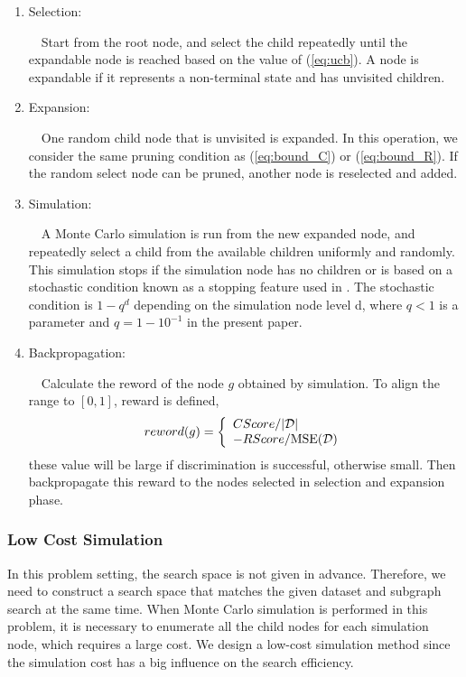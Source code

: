 \begin{enumerate}
	\item{Selection}:

	~~Start from the root node, and select the child repeatedly 
	until the expandable node is reached based on the value of (\ref{eq:ucb}).
	A node is expandable if it represents a non-terminal state and has unvisited children.

	\item{Expansion}:

	~~One random child node that is unvisited is expanded.
	In this operation, we consider the same pruning condition as (\ref{eq:bound_C}) or (\ref{eq:bound_R}). 
	If the random select node can be pruned, another node is reselected and added.

	\item{Simulation}:
	
	~~A Monte Carlo simulation is run from the new expanded node,
	and repeatedly select a child from the available children uniformly and randomly.
	This simulation stops if the simulation node has no children or 
	is based on a stochastic condition known as a stopping feature used in \cite{Romaric:2010}.
	The stochastic condition is $1 - q^{d}$ depending on the simulation node level d,
	where $q < 1$ is a parameter and $q = 1 - 10^{-1}$ in the present paper.
	
	\item{Backpropagation}:

	~~Calculate the reword of the node $g$ obtained by simulation.
	To align the range to $[0, 1]$, reward is defined, 
	\begin{eqnarray}
		reword(g) =
		\left\{
		\begin{array}{l}
			CScore / |\mathcal{D}|\\
			-RScore / \mathrm{MSE}(\mathcal{D})
		\end{array}
		\right.
	\end{eqnarray}
	these value will be large if discrimination is successful, otherwise small.
	Then backpropagate this reward to the nodes selected in selection and expansion phase.
\end{enumerate}

\subsubsection*{Low Cost Simulation}
In this problem setting, the search space is not given in advance.
Therefore, we need to construct a search space that matches the given dataset 
and subgraph search at the same time.
When Monte Carlo simulation is performed in this problem, 
it is necessary to enumerate all the child nodes for each simulation node, which requires a large cost.
We design a low-cost simulation method 
since the simulation cost has a big influence on the search efficiency.

